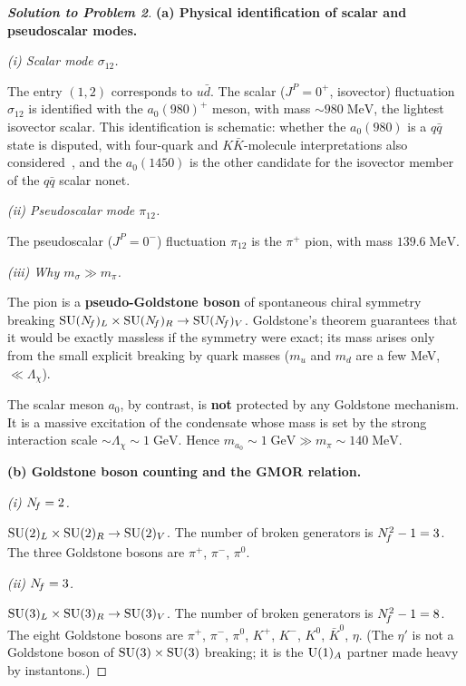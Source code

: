 \documentclass[11pt,a4paper]{article}
\newcommand{\Lchi}{\Lambda_\chi}
\begin{document}
\begin{proof}[\textbf{Solution to Problem 2}]

\textbf{(a) Physical identification of scalar and pseudoscalar modes.}

\textit{(i) Scalar mode $\sigma_{12}$.}

The entry $(1,2)$ corresponds to $u\bar{d}$.  The scalar
($J^P = 0^+$, isovector) fluctuation $\sigma_{12}$ is identified with
the $a_0(980)^+$ meson, with mass $\sim 980\;\text{MeV}$, the lightest
isovector scalar.  This identification is schematic: whether the
$a_0(980)$ is a $q\bar{q}$ state is disputed, with four-quark and
$K\bar{K}$-molecule interpretations also considered~\cite{PDG2024},
and the $a_0(1450)$ is the other candidate for the isovector member of
the $q\bar{q}$ scalar nonet.

\textit{(ii) Pseudoscalar mode $\pi_{12}$.}

The pseudoscalar ($J^P = 0^-$) fluctuation $\pi_{12}$ is
the $\pi^+$ pion, with mass $139.6\;\text{MeV}$.

\textit{(iii) Why $m_\sigma \gg m_\pi$.}

The pion is a \textbf{pseudo-Goldstone boson} of spontaneous chiral
symmetry breaking
$\mathrm{SU}(N_{\!f})_L \times \mathrm{SU}(N_{\!f})_R \to \mathrm{SU}(N_{\!f})_V$.  Goldstone's theorem
guarantees that it would be exactly massless if the symmetry were
exact; its mass arises only from the small explicit breaking by
quark masses ($m_u$ and $m_d$ are a few MeV, $\ll \Lchi$).

The scalar meson $a_0$, by contrast, is \textbf{not} protected by any
Goldstone mechanism.  It is a massive excitation of the condensate whose
mass is set by the strong interaction scale $\sim \Lambda_\chi
\sim 1\;\text{GeV}$.  Hence $m_{a_0} \sim 1\;\text{GeV} \gg
m_\pi \sim 140\;\text{MeV}$.

\bigskip

\textbf{(b) Goldstone boson counting and the GMOR relation.}

\textit{(i) $N_{\!f} = 2$.}

$\mathrm{SU}(2)_L \times \mathrm{SU}(2)_R \to \mathrm{SU}(2)_V$.  The number of broken
generators is $N_{\!f}^2 - 1 = 3$.  The three Goldstone bosons are
$\pi^+$, $\pi^-$, $\pi^0$.

\textit{(ii) $N_{\!f} = 3$.}

$\mathrm{SU}(3)_L \times \mathrm{SU}(3)_R \to \mathrm{SU}(3)_V$.  The number of broken
generators is $N_{\!f}^2 - 1 = 8$.  The eight Goldstone bosons are
$\pi^+$, $\pi^-$, $\pi^0$, $K^+$, $K^-$, $K^0$, $\bar{K}^0$,
$\eta$.  (The $\eta'$ is not a Goldstone boson of
$\mathrm{SU}(3) \times \mathrm{SU}(3)$ breaking; it is the $\mathrm{U}(1)_A$ partner
made heavy by instantons.)


\end{proof}
\end{document}

